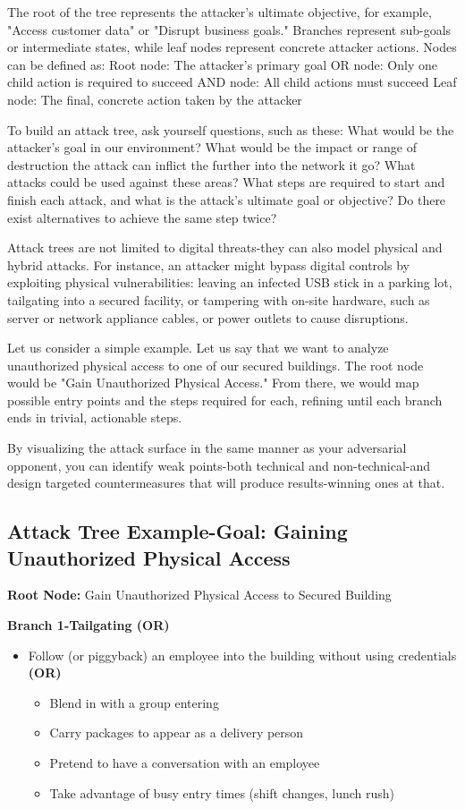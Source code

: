 The root of the tree represents the attacker's ultimate objective, for example, "Access customer data" or "Disrupt business goals." Branches represent sub-goals or intermediate states, while leaf nodes represent concrete attacker actions. Nodes can be defined as:
Root node: The attacker's primary goal
OR node: Only one child action is required to succeed
AND node: All child actions must succeed
Leaf node: The final, concrete action taken by the attacker

To build an attack tree, ask yourself questions, such as these:
What would be the attacker's goal in our environment?
What would be the impact or range of destruction the attack can inflict the further into the network it go?
What attacks could be used against these areas?
What steps are required to start and finish each attack, and what is the attack's ultimate goal or objective?
Do there exist alternatives to achieve the same step twice?

Attack trees are not limited to digital threats-they can also model physical and hybrid attacks. For instance, an attacker might bypass digital controls by exploiting physical vulnerabilities: leaving an infected USB stick in a parking lot, tailgating into a secured facility, or tampering with on-site hardware, such as server or network appliance cables, or power outlets to cause disruptions.

Let us consider a simple example. Let us say that we want to analyze unauthorized physical access to one of our secured buildings. The root node would be "Gain Unauthorized Physical Access." From there, we would map possible entry points and the steps required for each, refining until each branch ends in trivial, actionable steps.

By visualizing the attack surface in the same manner as your adversarial opponent, you can identify weak points-both technical and non-technical-and design targeted countermeasures that will produce results-winning ones at that.

\subsection{Attack Tree Example-Goal: Gaining Unauthorized Physical Access}

\textbf{Root Node:} Gain Unauthorized Physical Access to Secured Building

\textbf{Branch 1-Tailgating (OR)}
\begin{itemize}
    \item Follow (or piggyback) an employee into the building without using credentials \textbf{(OR)}
    \begin{itemize}
        \item Blend in with a group entering
        \item Carry packages to appear as a delivery person
        \item Pretend to have a conversation with an employee
        \item Take advantage of busy entry times (shift changes, lunch rush)
    \end{itemize}
\end{itemize}

